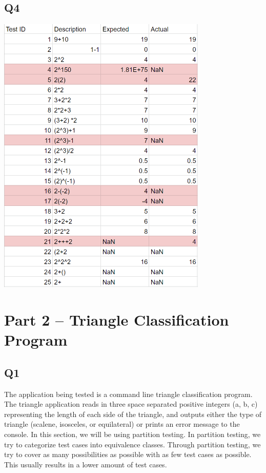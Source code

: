 \documentclass[12pt, letterpaper, titlepage]{article}
\begin{document}
\subsection*{Q4}
\includegraphics[width=10cm]{table1}

\section{Part 2 -- Triangle Classification Program}
\subsection*{Q1}
The application being tested is a command line triangle classification program. The triangle application reads in three space separated positive integers (a, b, c) representing the length of each side of the triangle, and outputs either the type of triangle (scalene, isosceles, or equilateral) or prints an error message to the console. In this section, we will be using partition testing. In partition testing, we try to categorize test cases into equivalence classes. Through partition testing, we try to cover as many possibilities as possible with as few test cases as possible. This usually results in a lower amount of test cases.
\end{document}
